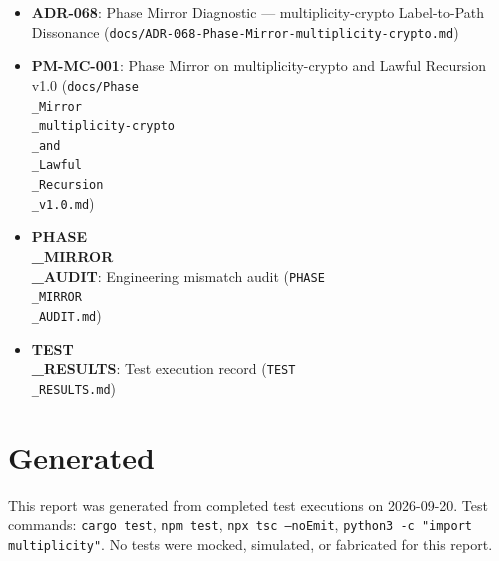\documentclass[11pt]{article}
\begin{document}
\begin{itemize}
  \item \textbf{ADR-068}: Phase Mirror Diagnostic --- multiplicity-crypto Label-to-Path Dissonance (\texttt{docs/ADR-068-Phase-Mirror-multiplicity-crypto.md})
  \item \textbf{PM-MC-001}: Phase Mirror on multiplicity-crypto and Lawful Recursion v1.0 (\texttt{docs/Phase\\_Mirror\\_multiplicity-crypto\\_and\\_Lawful\\_Recursion\\_v1.0.md})
  \item \textbf{PHASE\\_MIRROR\\_AUDIT}: Engineering mismatch audit (\texttt{PHASE\\_MIRROR\\_AUDIT.md})
  \item \textbf{TEST\\_RESULTS}: Test execution record (\texttt{TEST\\_RESULTS.md})
\end{itemize}

\section*{Generated}

This report was generated from completed test executions on 2026-09-20.
Test commands: \texttt{cargo test}, \texttt{npm test}, \texttt{npx tsc --noEmit}, \texttt{python3 -c "import multiplicity"}.
No tests were mocked, simulated, or fabricated for this report.
\end{document}
